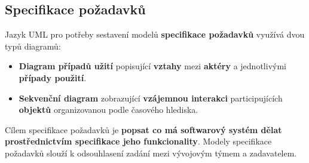 \subsection{Specifikace požadavků}
Jazyk UML pro potřeby sestavení modelů \textbf{specifikace požadavků} využívá dvou typů diagramů: 
\begin{itemize}
\item \textbf{Diagram případů užití} popisující \textbf{vztahy} mezi \textbf{aktéry} a jednotlivými \textbf{případy použití}. 
\item \textbf{Sekvenční diagram} zobrazující \textbf{vzájemnou interakci} participujících \textbf{objektů} organizovanou podle časového hlediska. 
\end{itemize}
Cílem specifikace požadavků je \textbf{popsat co má softwarový systém dělat prostřednictvím specifikace jeho funkcionality}.  Modely specifikace požadavků slouží k odsouhlasení zadání mezi vývojovým týmem a zadavatelem.


